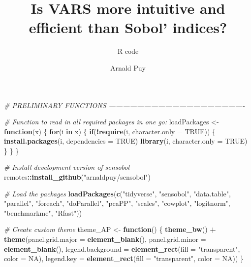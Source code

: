 \documentclass[11pt,]{article}
\title{Is VARS more intuitive and efficient than Sobol' indices?}
\subtitle{R code}
\author{Arnald Puy}
\date{}
\newenvironment{Shaded}{\begin{snugshade}}{\end{snugshade}}
\newcommand{\CommentTok}[1]{\textcolor[rgb]{0.56,0.35,0.01}{\textit{#1}}}
\newcommand{\ControlFlowTok}[1]{\textcolor[rgb]{0.13,0.29,0.53}{\textbf{#1}}}
\newcommand{\DataTypeTok}[1]{\textcolor[rgb]{0.13,0.29,0.53}{#1}}
\newcommand{\KeywordTok}[1]{\textcolor[rgb]{0.13,0.29,0.53}{\textbf{#1}}}
\newcommand{\NormalTok}[1]{#1}
\newcommand{\OperatorTok}[1]{\textcolor[rgb]{0.81,0.36,0.00}{\textbf{#1}}}
\newcommand{\OtherTok}[1]{\textcolor[rgb]{0.56,0.35,0.01}{#1}}
\newcommand{\StringTok}[1]{\textcolor[rgb]{0.31,0.60,0.02}{#1}}
\begin{document}
\maketitle

\newpage

\begin{Shaded}
\begin{Highlighting}[]
\CommentTok{# PRELIMINARY FUNCTIONS ----------------------------------------------------------}

\CommentTok{# Function to read in all required packages in one go:}
\NormalTok{loadPackages <-}\StringTok{ }\ControlFlowTok{function}\NormalTok{(x) \{}
  \ControlFlowTok{for}\NormalTok{(i }\ControlFlowTok{in}\NormalTok{ x) \{}
    \ControlFlowTok{if}\NormalTok{(}\OperatorTok{!}\KeywordTok{require}\NormalTok{(i, }\DataTypeTok{character.only =} \OtherTok{TRUE}\NormalTok{)) \{}
      \KeywordTok{install.packages}\NormalTok{(i, }\DataTypeTok{dependencies =} \OtherTok{TRUE}\NormalTok{)}
      \KeywordTok{library}\NormalTok{(i, }\DataTypeTok{character.only =} \OtherTok{TRUE}\NormalTok{)}
\NormalTok{    \}}
\NormalTok{  \}}
\NormalTok{\}}

\CommentTok{# Install development version of sensobol}
\NormalTok{remotes}\OperatorTok{::}\KeywordTok{install_github}\NormalTok{(}\StringTok{"arnaldpuy/sensobol"}\NormalTok{)}

\CommentTok{# Load the packages}
\KeywordTok{loadPackages}\NormalTok{(}\KeywordTok{c}\NormalTok{(}\StringTok{"tidyverse"}\NormalTok{, }\StringTok{"sensobol"}\NormalTok{, }\StringTok{"data.table"}\NormalTok{, }\StringTok{"parallel"}\NormalTok{, }
               \StringTok{"foreach"}\NormalTok{, }\StringTok{"doParallel"}\NormalTok{, }\StringTok{"pcaPP"}\NormalTok{, }\StringTok{"scales"}\NormalTok{, }
               \StringTok{"cowplot"}\NormalTok{, }\StringTok{"logitnorm"}\NormalTok{, }\StringTok{"benchmarkme"}\NormalTok{, }\StringTok{"Rfast"}\NormalTok{))}

\CommentTok{# Create custom theme}
\NormalTok{theme_AP <-}\StringTok{ }\ControlFlowTok{function}\NormalTok{() \{}
  \KeywordTok{theme_bw}\NormalTok{() }\OperatorTok{+}
\StringTok{    }\KeywordTok{theme}\NormalTok{(}\DataTypeTok{panel.grid.major =} \KeywordTok{element_blank}\NormalTok{(),}
          \DataTypeTok{panel.grid.minor =} \KeywordTok{element_blank}\NormalTok{(),}
          \DataTypeTok{legend.background =} \KeywordTok{element_rect}\NormalTok{(}\DataTypeTok{fill =} \StringTok{"transparent"}\NormalTok{,}
                                           \DataTypeTok{color =} \OtherTok{NA}\NormalTok{),}
          \DataTypeTok{legend.key =} \KeywordTok{element_rect}\NormalTok{(}\DataTypeTok{fill =} \StringTok{"transparent"}\NormalTok{,}
                                    \DataTypeTok{color =} \OtherTok{NA}\NormalTok{))}
\NormalTok{\}}


\end{Highlighting}
\end{Shaded}
\end{document}
